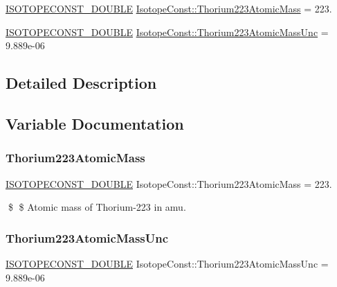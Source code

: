 \begin{DoxyCompactItemize}
\item 
\mbox{\hyperlink{group___isotope_const-_macros_ga8f45a7272ce02c0b4c65c44636ed719a}{I\+S\+O\+T\+O\+P\+E\+C\+O\+N\+S\+T\+\_\+\+D\+O\+U\+B\+LE}} \mbox{\hyperlink{group___isotope_const-_thorium-_th223_gaf15bf08ba765dc95b7bfa6059264827f}{Isotope\+Const\+::\+Thorium223\+Atomic\+Mass}} = 223.
\item 
\mbox{\hyperlink{group___isotope_const-_macros_ga8f45a7272ce02c0b4c65c44636ed719a}{I\+S\+O\+T\+O\+P\+E\+C\+O\+N\+S\+T\+\_\+\+D\+O\+U\+B\+LE}} \mbox{\hyperlink{group___isotope_const-_thorium-_th223_gacc2fa27a2d4f4448cdd21cd4b12cc2e1}{Isotope\+Const\+::\+Thorium223\+Atomic\+Mass\+Unc}} = 9.\+889e-\/06
\end{DoxyCompactItemize}


\subsection{Detailed Description}


\subsection{Variable Documentation}
\mbox{\label{group___isotope_const-_thorium-_th223_gaf15bf08ba765dc95b7bfa6059264827f}} 
\subsubsection{\texorpdfstring{Thorium223\+Atomic\+Mass}{Thorium223AtomicMass}}
{\footnotesize\ttfamily \mbox{\hyperlink{group___isotope_const-_macros_ga8f45a7272ce02c0b4c65c44636ed719a}{I\+S\+O\+T\+O\+P\+E\+C\+O\+N\+S\+T\+\_\+\+D\+O\+U\+B\+LE}} Isotope\+Const\+::\+Thorium223\+Atomic\+Mass = 223.}

\$ \$ Atomic mass of Thorium-\/223 in amu. \mbox{\label{group___isotope_const-_thorium-_th223_gacc2fa27a2d4f4448cdd21cd4b12cc2e1}} 
\subsubsection{\texorpdfstring{Thorium223\+Atomic\+Mass\+Unc}{Thorium223AtomicMassUnc}}
{\footnotesize\ttfamily \mbox{\hyperlink{group___isotope_const-_macros_ga8f45a7272ce02c0b4c65c44636ed719a}{I\+S\+O\+T\+O\+P\+E\+C\+O\+N\+S\+T\+\_\+\+D\+O\+U\+B\+LE}} Isotope\+Const\+::\+Thorium223\+Atomic\+Mass\+Unc = 9.\+889e-\/06}

